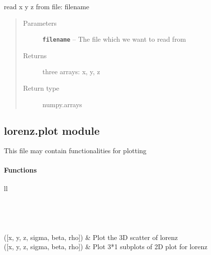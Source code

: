 \documentclass[letterpaper,10pt,english]{sphinxmanual}
\begin{document}

\begin{fulllineitems}
\label{_autosummary/lorenz:lorenz.filehandling.read_x_y_z_fromfile}
read x y z from file: filename
\begin{quote}\begin{description}
\item[{Parameters}] \leavevmode
\textbf{\texttt{filename}} -- The file which we want to read from

\item[{Returns}] \leavevmode
three arrays: x, y, z

\item[{Return type}] \leavevmode
numpy.arrays

\end{description}\end{quote}

\end{fulllineitems}



\subsection{lorenz.plot module}
\label{_autosummary/lorenz:lorenz-plot-module}\label{_autosummary/lorenz:module-lorenz.plot}
This file may contain functionalities for plotting
\paragraph{Functions}

\begin{longtable}{ll}
\hline
\endfirsthead

%
{{}} \\
\hline
\endhead

\hline {} \\ \hline
\endfoot

\endlastfoot


{\hyperref[_autosummary/lorenz:lorenz.plot.plot3Dpdf]{}}({[}x, y, z, sigma, beta, rho{]})
 & 
Plot the 3D scatter of lorenz
\\
\hline
{\hyperref[_autosummary/lorenz:lorenz.plot.plot2Dpdf]{}}({[}x, y, z, sigma, beta, rho{]})
 & 
Plot 3*1 subplots of 2D plot for lorenz
\\
\hline\end{longtable}
\end{document}
